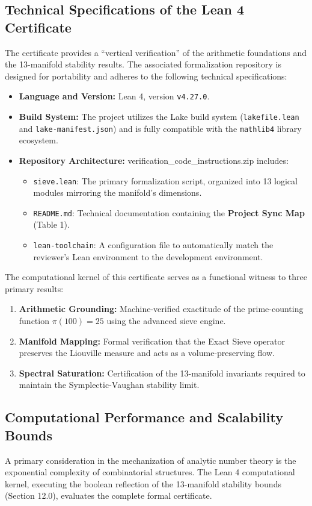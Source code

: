 \documentclass[sn-mathphys-num, pdflatex]{sn-jnl}
\begin{document}
\subsection{Technical Specifications of the Lean 4 Certificate} The certificate provides a ``vertical verification'' of the arithmetic foundations and the 13-manifold stability results. The associated formalization repository is designed for portability and adheres to the following technical specifications:

\begin{itemize}
\item \textbf{Language and Version:} Lean 4, version \texttt{v4.27.0}.
\item \textbf{Build System:} The project utilizes the Lake build system (\texttt{lakefile.lean} and \texttt{lake-manifest.json}) and is fully compatible with the \texttt{mathlib4} library ecosystem.
\item \textbf{Repository Architecture:} verification\_code\_instructions.zip includes:
\begin{itemize}
    \item \texttt{sieve.lean}: The primary formalization script, organized into 13 logical modules mirroring the manifold's dimensions.
    \item \texttt{README.md}: Technical documentation containing the \textbf{Project Sync Map} (Table 1).
    \item \texttt{lean-toolchain}: A configuration file to automatically match the reviewer's Lean environment to the development environment.
    \end{itemize}
\end{itemize}

The computational kernel of this certificate serves as a functional witness to three primary results:
\begin{enumerate}
    \item \textbf{Arithmetic Grounding:} Machine-verified exactitude of the prime-counting function $\pi(100) = 25$ using the advanced sieve engine.
    \item \textbf{Manifold Mapping:} Formal verification that the Exact Sieve operator preserves the Liouville measure and acts as a volume-preserving flow.
    \item \textbf{Spectral Saturation:} Certification of the 13-manifold invariants required to maintain the Symplectic-Vaughan stability limit.
\end{enumerate}

\subsection{Computational Performance and Scalability Bounds}
A primary consideration in the mechanization of analytic number theory is the exponential complexity of combinatorial structures. The Lean 4 computational kernel, executing the boolean reflection of the 13-manifold stability bounds (Section 12.0), evaluates the complete formal certificate. 
\end{document}
